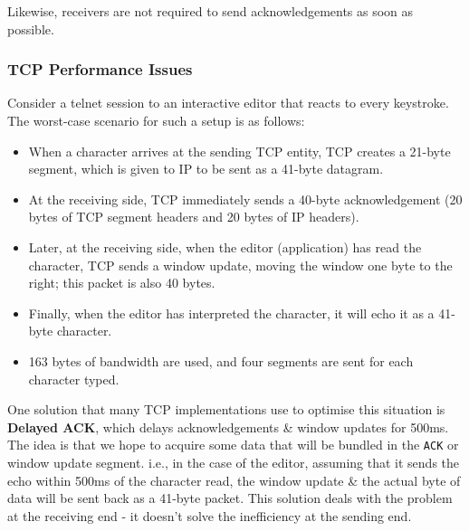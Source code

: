 \documentclass[11pt]{article}
\begin{document}
Likewise, receivers are not required to send acknowledgements as soon as possible.

\subsubsection{TCP Performance Issues}
Consider a telnet session to an interactive editor that reacts to every keystroke. 
The worst-case scenario for such a setup is as follows:
\begin{itemize}
    \item   When a character arrives at the sending TCP entity, TCP creates a 21-byte segment, which is given to IP to be sent as a 41-byte datagram.
    \item   At the receiving side, TCP immediately sends a 40-byte acknowledgement (20 bytes of TCP segment headers and 20 bytes of IP headers). 
    \item   Later, at the receiving side, when the editor (application) has read the character, TCP sends a window update, moving the window one byte to the right; this packet is also 40 bytes.
    \item   Finally, when the editor has interpreted the character, it will echo it as a 41-byte character.
    \item   163 bytes of bandwidth are used, and four segments are sent for each character typed.
\end{itemize}

One solution that many TCP implementations use to optimise this situation is \textbf{Delayed ACK}, which delays acknowledgements \& window updates for 500ms. 
The idea is that we hope to acquire some data that will be bundled in the \verb|ACK| or window update segment.
i.e., in the case of the editor, assuming that it sends the echo within 500ms of the character read, the window update \& the actual byte of data will be sent back as a 41-byte packet.
This solution deals with the problem at the receiving end - it doesn't solve the inefficiency at the sending end.
\end{document}
